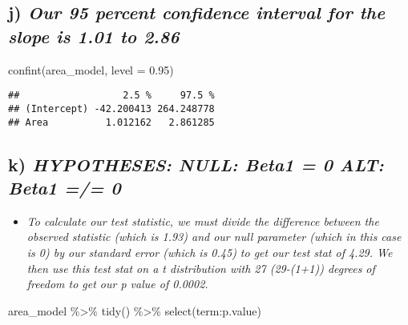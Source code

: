 \documentclass[
]{article}
\newenvironment{Shaded}{\begin{snugshade}}{\end{snugshade}}
\newcommand{\AttributeTok}[1]{\textcolor[rgb]{0.77,0.63,0.00}{#1}}
\newcommand{\FloatTok}[1]{\textcolor[rgb]{0.00,0.00,0.81}{#1}}
\newcommand{\FunctionTok}[1]{\textcolor[rgb]{0.00,0.00,0.00}{#1}}
\newcommand{\NormalTok}[1]{#1}
\newcommand{\SpecialCharTok}[1]{\textcolor[rgb]{0.00,0.00,0.00}{#1}}
\providecommand{\tightlist}{%
  \setlength{\itemsep}{0pt}\setlength{\parskip}{0pt}}
\begin{document}
\hypertarget{j-our-95-percent-confidence-interval-for-the-slope-is-1.01-to-2.86}{%
\subsection{\texorpdfstring{j) \emph{Our 95 percent confidence interval
for the slope is 1.01 to
2.86}}{j) Our 95 percent confidence interval for the slope is 1.01 to 2.86}}\label{j-our-95-percent-confidence-interval-for-the-slope-is-1.01-to-2.86}}

\begin{Shaded}
\begin{Highlighting}[]
\FunctionTok{confint}\NormalTok{(area\_model, }\AttributeTok{level =} \FloatTok{0.95}\NormalTok{)}
\end{Highlighting}
\end{Shaded}

\begin{verbatim}
##                  2.5 %     97.5 %
## (Intercept) -42.200413 264.248778
## Area          1.012162   2.861285
\end{verbatim}

\hypertarget{k-hypotheses-null-beta1-0-alt-beta1-0}{%
\subsection{\texorpdfstring{k) \emph{HYPOTHESES: NULL: Beta1 = 0 ALT:
Beta1 =/=
0}}{k) HYPOTHESES: NULL: Beta1 = 0 ALT: Beta1 =/= 0}}\label{k-hypotheses-null-beta1-0-alt-beta1-0}}

\begin{itemize}
\tightlist
\item
  \emph{To calculate our test statistic, we must divide the difference
  between the observed statistic (which is 1.93) and our null parameter
  (which in this case is 0) by our standard error (which is 0.45) to get
  our test stat of 4.29. We then use this test stat on a t distribution
  with 27 (29-(1+1)) degrees of freedom to get our p value of 0.0002.}
\end{itemize}

\begin{Shaded}
\begin{Highlighting}[]
\NormalTok{area\_model }\SpecialCharTok{\%\textgreater{}\%}
  \FunctionTok{tidy}\NormalTok{() }\SpecialCharTok{\%\textgreater{}\%}
    \FunctionTok{select}\NormalTok{(term}\SpecialCharTok{:}\NormalTok{p.value)}
\end{Highlighting}
\end{Shaded}
\end{document}
